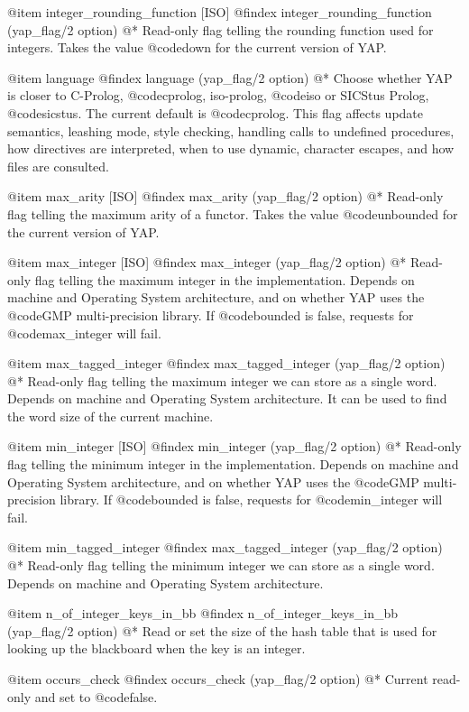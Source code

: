 {{{{{{{{{@item integer_rounding_function [ISO]
@findex integer_rounding_function (yap_flag/2 option)
@*
Read-only flag telling the rounding function used for integers. Takes the value
@code{down} for the current version of YAP.

@item language
@findex language (yap_flag/2 option)
@* 
Choose whether YAP is closer to C-Prolog, @code{cprolog}, iso-prolog,
@code{iso} or SICStus Prolog, @code{sicstus}. The current default is
@code{cprolog}. This flag affects update semantics, leashing mode,
style checking, handling calls to undefined procedures, how directives
are interpreted, when to use dynamic, character escapes, and how files
are consulted.

@item max_arity [ISO]
@findex max_arity (yap_flag/2 option)
@*
Read-only flag telling the maximum arity of a functor. Takes the value
@code{unbounded} for the current version of YAP.

@item max_integer [ISO]
@findex max_integer (yap_flag/2 option)
@*
Read-only flag telling the maximum integer in the
implementation. Depends on machine and Operating System
architecture, and on whether YAP uses the @code{GMP} multi-precision
library. If @code{bounded} is false, requests for @code{max_integer}
will fail.

@item max_tagged_integer 
@findex max_tagged_integer (yap_flag/2 option)
@*
Read-only flag telling the maximum integer we can store as a single
word. Depends on machine and Operating System
architecture. It can be used to find the word size of the current machine.

@item min_integer [ISO]
@findex min_integer (yap_flag/2 option)
@* Read-only flag telling the minimum integer in the
implementation. Depends on machine and Operating System architecture,
and on whether YAP uses the @code{GMP} multi-precision library. If
@code{bounded} is false, requests for @code{min_integer} will fail.

@item min_tagged_integer 
@findex max_tagged_integer (yap_flag/2 option)
@*
Read-only flag telling the minimum integer we can store as a single
word. Depends on machine and Operating System
architecture.

@item n_of_integer_keys_in_bb
@findex n_of_integer_keys_in_bb (yap_flag/2 option)
@*
Read or set the size of the hash table that is used for looking up the
blackboard when the key is an integer.

@item occurs_check
@findex occurs_check (yap_flag/2 option)
@*
Current read-only and set to @code{false}.

}}}}}}}}}
